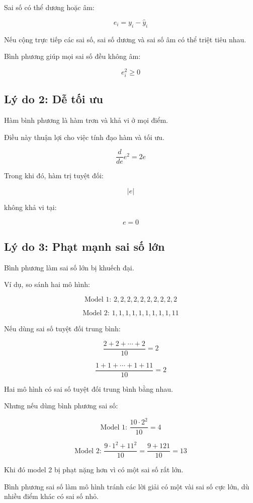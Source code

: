 Sai số có thể dương hoặc âm:

\[
    e_i = y_i-\hat{y}_i
\]

Nếu cộng trực tiếp các sai số, sai số dương và sai số âm có thể triệt tiêu nhau.

Bình phương giúp mọi sai số đều không âm:

\[
    e_i^2 \geq 0
\]

\subsection{Lý do 2: Dễ tối ưu}

Hàm bình phương là hàm trơn và khả vi ở mọi điểm.

Điều này thuận lợi cho việc tính đạo hàm và tối ưu.

\[
    \frac{d}{de}e^2=2e
\]

Trong khi đó, hàm trị tuyệt đối:

\[
    |e|
\]

không khả vi tại:

\[
    e=0
\]

\subsection{Lý do 3: Phạt mạnh sai số lớn}

Bình phương làm sai số lớn bị khuếch đại.

Ví dụ, so sánh hai mô hình:

\[
    \text{Model 1: } 2,2,2,2,2,2,2,2,2,2
\]

\[
    \text{Model 2: } 1,1,1,1,1,1,1,1,1,11
\]

Nếu dùng sai số tuyệt đối trung bình:

\[
    \frac{2+2+\cdots+2}{10}=2
\]

\[
    \frac{1+1+\cdots+1+11}{10}=2
\]

Hai mô hình có sai số tuyệt đối trung bình bằng nhau.

Nhưng nếu dùng bình phương sai số:

\[
    \text{Model 1: }
    \frac{10\cdot 2^2}{10}=4
\]

\[
    \text{Model 2: }
    \frac{9\cdot 1^2+11^2}{10}
    =
    \frac{9+121}{10}
    =
    13
\]

Khi đó model 2 bị phạt nặng hơn vì có một sai số rất lớn.

\begin{ghinho}
Bình phương sai số làm mô hình tránh các lời giải có một vài sai số cực lớn, dù nhiều điểm khác có sai số nhỏ.
\end{ghinho}

